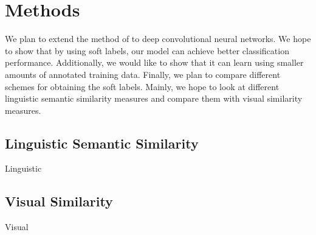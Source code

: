 \section{Methods}

We plan to extend the method of \cite{zhao2011large} to deep convolutional
neural networks. We hope to show that by using soft labels, our model can
achieve better classification performance. Additionally, we would like to
show that it can learn using smaller amounts of annotated training data.
Finally, we plan to compare different schemes for obtaining the soft labels.
Mainly, we hope to look at different linguistic semantic similarity measures
and compare them with visual similarity measures.


\subsection{Linguistic Semantic Similarity}

Linguistic


\subsection{Visual Similarity}

Visual
